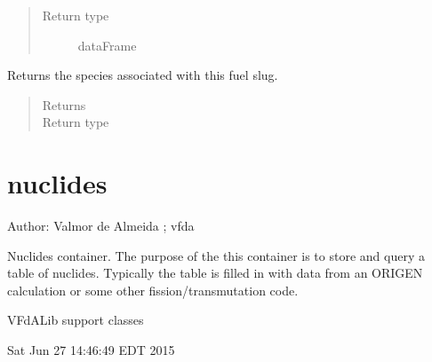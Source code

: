 \documentclass[letterpaper,10pt,openany,oneside,english]{sphinxmanual}
\begin{document}
\begin{fulllineitems}
\begin{fulllineitems}
\begin{quote}
\begin{description}
\item[{Return type}] \leavevmode
dataFrame

\end{description}\end{quote}

\end{fulllineitems}


\begin{fulllineitems}
\label{\detokenize{support_rst/fuelslug:fuelslug.FuelSlug.specs}}
Returns the species associated with this fuel slug.
\begin{quote}\begin{description}
\item[{Returns}] \leavevmode
{}

\item[{Return type}] \leavevmode
{}

\end{description}\end{quote}

\end{fulllineitems}


\end{fulllineitems}



\section{nuclides}
\label{\detokenize{support_rst/nuclides:module-nuclides}}\label{\detokenize{support_rst/nuclides:nuclides}}\label{\detokenize{support_rst/nuclides::doc}}
Author: Valmor de Almeida ; vfda

Nuclides container.
The purpose of the this container is to store and query a table of nuclides.
Typically the table is filled in with data from an ORIGEN calculation or
some other fission/transmutation code.

VFdALib support classes

Sat Jun 27 14:46:49 EDT 2015
\end{document}
